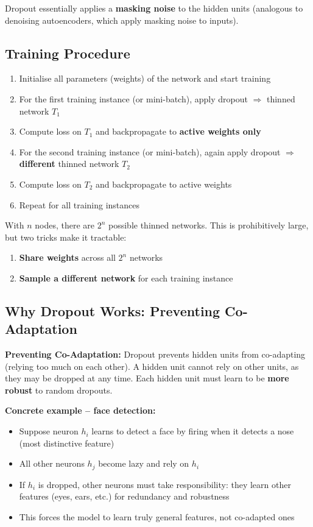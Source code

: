 \documentclass[12pt,a4paper]{article}
\begin{document}
Dropout essentially applies a \textbf{masking noise} to the hidden units (analogous to denoising autoencoders, which apply masking noise to inputs).

\subsection{Training Procedure}

\begin{enumerate}
  \item Initialise all parameters (weights) of the network and start training
  \item For the first training instance (or mini-batch), apply dropout $\Rightarrow$ thinned network $T_1$
  \item Compute loss on $T_1$ and backpropagate to \textbf{active weights only}
  \item For the second training instance (or mini-batch), again apply dropout $\Rightarrow$ \textbf{different} thinned network $T_2$
  \item Compute loss on $T_2$ and backpropagate to active weights
  \item Repeat for all training instances
\end{enumerate}

With $n$ nodes, there are $2^n$ possible thinned networks. This is prohibitively large, but two tricks make it tractable:
\begin{enumerate}
  \item \textbf{Share weights} across all $2^n$ networks
  \item \textbf{Sample a different network} for each training instance
\end{enumerate}

\subsection{Why Dropout Works: Preventing Co-Adaptation}

\begin{keybox}
\textbf{Preventing Co-Adaptation:} Dropout prevents hidden units from co-adapting (relying too much on each other). A hidden unit cannot rely on other units, as they may be dropped at any time. Each hidden unit must learn to be \textbf{more robust} to random dropouts.
\end{keybox}

\textbf{Concrete example -- face detection:}
\begin{itemize}
  \item Suppose neuron $h_i$ learns to detect a face by firing when it detects a nose (most distinctive feature)
  \item All other neurons $h_j$ become lazy and rely on $h_i$
  \item If $h_i$ is dropped, other neurons must take responsibility: they learn other features (eyes, ears, etc.) for redundancy and robustness
  \item This forces the model to learn truly general features, not co-adapted ones
\end{itemize}
\end{document}
